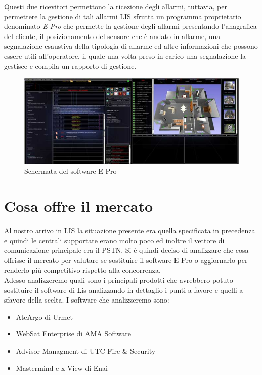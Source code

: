 Questi due ricevitori permettono la ricezione degli allarmi, tuttavia, per permettere la gestione di tali allarmi LIS sfrutta un programma proprietario denominato \emph{E-Pro} che permette la gestione degli allarmi presentando l'anagrafica del cliente, il posizionamento del sensore che è andato in allarme, una segnalazione esaustiva della tipologia di allarme ed altre informazioni che possono essere utili all'operatore, il quale una volta preso in carico una segnalazione la gestisce e compila un rapporto di gestione.
\begin{figure}
\centering
\includegraphics[width=0.5\linewidth]{pictures/schermataepro.jpg}
\caption{Schermata del software E-Pro}\label{fig:epro}
\end{figure}
\section{Cosa offre il mercato}
Al nostro arrivo in LIS la situazione presente era quella specificata in precedenza e quindi le centrali supportate erano molto poco ed inoltre il vettore di comunicazione principale era il PSTN. Si è quindi deciso di analizzare che cosa offrisse il mercato per valutare se sostituire il software E-Pro o aggiornarlo per renderlo più competitivo rispetto alla concorrenza.\\
Adesso analizzeremo quali sono i principali prodotti che avrebbero potuto sostituire il software di Lis analizzando in dettaglio i punti a favore e quelli a sfavore della scelta.
I software che analizzeremo sono:
\begin{itemize}
	\item AteArgo di Urmet
	\item WebSat Enterprise di AMA Software
	\item Advisor Managment di UTC Fire \& Security
	\item Mastermind e x-View di Enai
\end{itemize}
